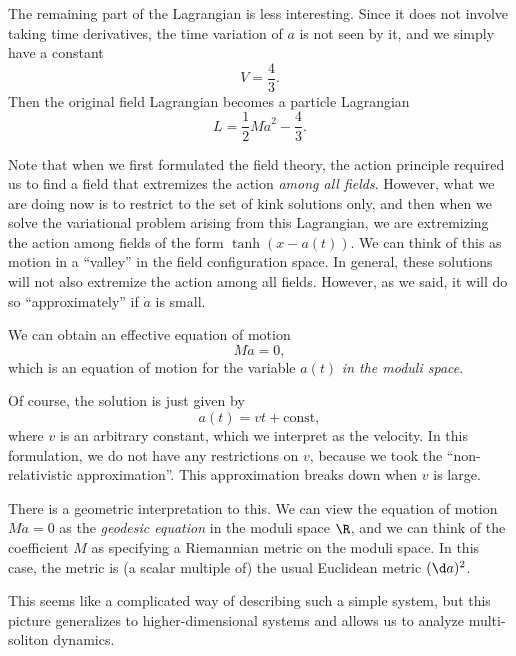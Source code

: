 \documentclass[a4paper]{article}
\begin{document}
The remaining part of the Lagrangian is less interesting. Since it does not involve taking time derivatives, the time variation of $a$ is not seen by it, and we simply have a constant
\[
  V = \frac{4}{3}.
\]
Then the original field Lagrangian becomes a particle Lagrangian
\[
  L = \frac{1}{2}M \dot{a}^2 - \frac{4}{3}.
\]

Note that when we first formulated the field theory, the action principle required us to find a field that extremizes the action \emph{among all fields}. However, what we are doing now is to restrict to the set of kink solutions only, and then when we solve the variational problem arising from this Lagrangian, we are extremizing the action among fields of the form $\tanh (x - a(t))$. We can think of this as motion in a ``valley'' in the field configuration space. In general, these solutions will not also extremize the action among all fields. However, as we said, it will do so ``approximately'' if $\dot{a}$ is small.

We can obtain an effective equation of motion
\[
  M \ddot{a} = 0,
\]
which is an equation of motion for the variable $a(t)$ \emph{in the moduli space}.

Of course, the solution is just given by
\[
  a(t) = vt + \mathrm{const},
\]
where $v$ is an arbitrary constant, which we interpret as the velocity. In this formulation, we do not have any restrictions on $v$, because we took the ``non-relativistic approximation''. This approximation breaks down when $v$ is large.

There is a geometric interpretation to this. We can view the equation of motion $M\ddot{a} = 0$ as the \emph{geodesic equation} in the moduli space $\R$, and we can think of the coefficient $M$ as specifying a Riemannian metric on the moduli space. In this case, the metric is (a scalar multiple of) the usual Euclidean metric $(\d a)^2$.

This seems like a complicated way of describing such a simple system, but this picture generalizes to higher-dimensional systems and allows us to analyze multi-soliton dynamics.
\end{document}
